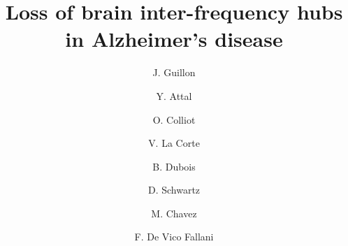 \documentclass[1p]{elsarticle}
\begin{document}
\begin{frontmatter}



	\title{Loss of brain inter-frequency hubs in Alzheimer's disease} %



	\author[ARAMISLABAddress,ICMAddress]{J. Guillon}
	\author[MyBrainAddress]{Y. Attal}
	\author[ARAMISLABAddress,ICMAddress]{O. Colliot}
	\author[DescartesAddress,MemAndCogLabAddress]{V. La Corte}
	\author[IM2AAddress]{B. Dubois}
	\author[ICMAddress]{D. Schwartz}
	\author[ICMAddress]{M. Chavez}
	\author[ARAMISLABAddress,ICMAddress]{F. De Vico Fallani}
	\address[ARAMISLABAddress]{Inria Paris, Aramis project-team, 75013, Paris, France}
	\address[ICMAddress]{CNRS UMR-7225, Sorbonne Universites, UPMC Univ Paris 06, Inserm U-1127, Institut du cerveau et la moelle (ICM), Hopital Pitie-Salpetriere, 75013, Paris, France}
	\address[MyBrainAddress]{myBrain Technologies, Paris, France}
	\address[IM2AAddress]{Department of Neurology, Institut de la Mémoire et de la Maladie d’Alzheimer - IM2A, Paris, France}
	\address[DescartesAddress]{Institute of Psychology, University Paris Descartes, Sorbonne Paris Cite, France}
	\address[MemAndCogLabAddress]{INSERM UMR 894, Center of Psychiatry and Neurosciences, Memory and Cognition Laboratory, Paris, France}




\end{frontmatter}
\end{document}
